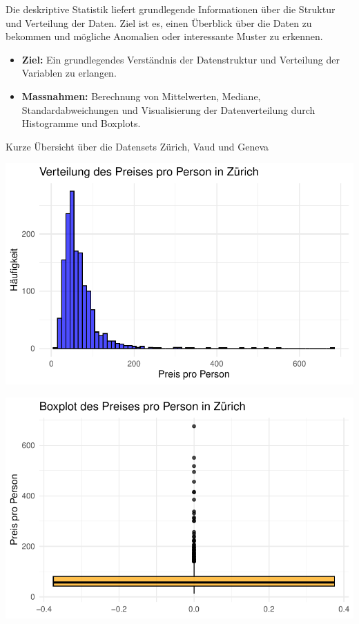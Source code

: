 \documentclass[
  journal,
]{IEEEtran}%
\begin{document}
Die deskriptive Statistik liefert grundlegende Informationen über die
Struktur und Verteilung der Daten. Ziel ist es, einen Überblick über die
Daten zu bekommen und mögliche Anomalien oder interessante Muster zu
erkennen.

\begin{itemize}
\item
  \textbf{Ziel:} Ein grundlegendes Verständnis der Datenstruktur und
  Verteilung der Variablen zu erlangen.
\item
  \textbf{Massnahmen:} Berechnung von Mittelwerten, Mediane,
  Standardabweichungen und Visualisierung der Datenverteilung durch
  Histogramme und Boxplots.
\end{itemize}

Kurze Übersicht über die Datensets Zürich, Vaud und Geneva

\includegraphics{main_files/figure-pdf/descriptive zurich-1.pdf}

\includegraphics{main_files/figure-pdf/descriptive zurich-2.pdf}
\end{document}
